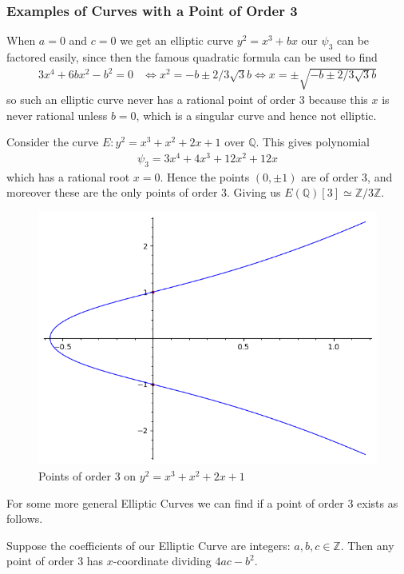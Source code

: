 \subsubsection{Examples of Curves with a Point of Order 3}%
\label{ssub:examples_of_curves_with_a_point_of_order_3}
\begin{example}
  When $a = 0$ and $c = 0$
  we get an elliptic curve $y^2 = x^3 + bx$
  our $\psi_3$ can be factored easily, since then
  the famous quadratic formula can be used to find
  \begin{align*}
    3x^4 + 6bx^2 - b^2 = 0 &\iff
    x^2 = -b \pm 2/3 \sqrt{3} b
    \iff
    x = \pm \sqrt{-b \pm 2/3 \sqrt{3} b}
  \end{align*}
  so such an elliptic curve never has
  a rational point of order 3 because this $x$ is never rational unless
  $b = 0$, which is a singular curve and hence not elliptic.
\end{example}
\begin{example}
  Consider the curve $E: y^2 = x^3 + x^2 + 2x + 1$ over $\mathbb{Q}$.
  This gives polynomial
  \begin{align*}
    \psi_3 = 3x^4 + 4x^3 + 12x^2 + 12x
  \end{align*}
  which has a rational root $x = 0$.
  Hence the points $(0, \pm 1)$ are of order 3, and moreover these
  are the only points of order 3. Giving us $E(\mathbb{Q})[3] \simeq \mathbb{Z}/3\mathbb{Z}$.
  \begin{figure}[H]
    \centering
    \includegraphics[width=0.4\linewidth]{pointsOfFiniteOrder/examplePointsOrder3.png}
    \caption{Points of order 3 on $y^2 = x^3 + x^2 + 2x + 1$ }%
    \label{fig:pointsOfFiniteOrder/examplePointsOrder3}
  \end{figure}
\end{example}
For some more general Elliptic Curves we can find if a point of order 3 exists as follows.
\begin{corollary}
  Suppose the coefficients of our Elliptic Curve are integers: $a, b, c \in \mathbb{Z}$.
  Then any point of order 3 has $x$-coordinate dividing $4ac - b^2$.
\end{corollary}
